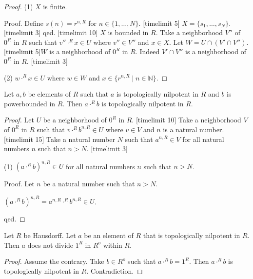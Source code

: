 \documentclass[11pt]{article}
\newcommand{\powers}[2]{\{{#1}^{n,#2} \mid n \in \mathbb{N}\}}
\newcommand{\Seq}[2]{\{#1,\dots,#2\}}
\newcommand{\FinSet}[3]{\{#1_{#2},\dots,#1_{#3}\}}
\begin{document}
\begin{forthel}
\begin{proof}
(1) $X$ is finite.

Proof. Define $s(n)= r^{n,R}$ for $n \in \Seq{1}{N}$.
[timelimit 5]
$X = \FinSet{s}{1}{N}$.
[timelimit 3]
qed.
[timelimit 10]
$X$ is bounded in $R$.
Take a neighborhood $V''$ of $0^{R}$ in $R$ such that
$v'' \cdot^{R} x \in U$ where $v'' \in V''$ and $x \in X$.
Let $W = U \cap (V' \cap V'')$. 
[timelimit 5]$W$ is a neighborhood
of $0^{R}$ in $R$. Indeed $V' \cap V''$ is a neighborhood
of $0^{R}$ in $R$.
[timelimit 3]

(2) $w \cdot^{R} x \in U$ where $w \in W$ and $x \in \powers{r}{R}$.
    
\end{proof}

\begin{lemma}
Let $a,b$ be elements of $R$ such that $a$ is topologically nilpotent in $R$ and
$b$ is powerbounded in $R$.
Then $a\cdot^{R} b$ is topologically nilpotent in $R$.
\end{lemma}
\begin{proof}
Let $U$ be a neighborhood of $0^{R}$ in $R$.
[timelimit 10]
Take a neighborhood $V$ of $0^{R}$ in $R$ such that
$v \cdot^{R} b^{n,R} \in U$ where $v \in V$ and $n$ is a natural number.
[timelimit 15]
Take a natural number $N$ such that
$a^{n,R} \in V$ for all natural numbers $n$ such that $n > N$.
[timelimit 3]

(1) $(a \cdot^{R} b)^{n,R} \in U$ for all natural numbers $n$ such that $n > N$.

Proof. Let $n$ be a natural number such that $n > N$.

$(a \cdot^{R} b)^{n,R} = a^{n,R} \cdot^{R} b^{n,R} \in U$. 

qed. 
\end{proof}

\begin{lemma} Let $R$ be Hausdorff.
Let $a$ be an element of $R$ that is topologically nilpotent in $R$.
Then $a$ does not divide $1^{R}$ in $R^o$ within $R$.
\end{lemma}
\begin{proof}
Assume the contrary. 
Take $b \in R^o$ such that $a \cdot^{R} b = 1^{R}$.
Then  $a \cdot^{R} b$ is topologically nilpotent in $R$.
Contradiction.
\end{proof}


\end{forthel}
\end{document}
